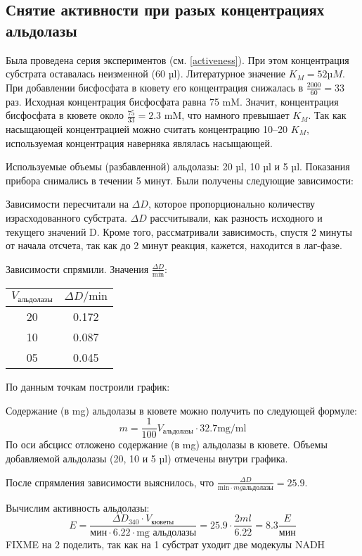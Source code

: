 \subsection{Снятие активности при разых концентрациях альдолазы}
Была проведена серия экспериментов (см. \ref{activeness}).
При этом концентрация субстрата оставалась неизменной (60 µl).
Литературное значение $K_M = 52 µM$.
При добавлении бисфосфата в кювету его концентрация снижалась в $\frac{2000}{60} = 33$ раз.
Исходная концентрация бисфосфата равна 75 mM.
Значит, концентрация бисфосфата в кювете около $\frac{75}{33} = 2.3$ mM,
что намного превышает $K_M$.
Так как насыщающей концентрацией можно считать концентрацию 10--20 $K_M$,
используемая концентрация наверняка являлась насыщающей.

Используемые объемы (разбавленной) альдолазы: 20 µl, 10 µl и 5 µl.
Показания прибора снимались в течении 5 минут.
Были получены следующие зависимости:



Зависимости пересчитали на $\Delta D$, которое пропорционально количеству израсходованного субстрата.
$\Delta D$ рассчитывали, как разность исходного и текущего значений D.
Кроме того, рассматривали зависимость, спустя 2 минуты от начала отсчета,
так как до 2 минут реакция, кажется, находится в лаг-фазе.



Зависимости спрямили. Значения $\frac{\Delta D}{\text{min}}$:

\begin{tabular}{|c|c|}
\hline
$ V_{\text{альдолазы}} $ & $ \Delta D / \text{min} $ \\
\hline
20 & 0.172 \\
10 & 0.087 \\
05 & 0.045 \\
\hline
\end{tabular}

По данным точкам построили график:



Содержание (в mg) альдолазы в кювете можно получить по следующей формуле:
$$ m = \frac{1}{100} V_\text{альдолазы} \cdot 32.7 \text{mg/ml} $$
По оси абсцисс отложено содержание (в mg) альдолазы в кювете.
Объемы добавляемой альдолазы (20, 10 и 5 µl) отмечены внутри графика.

После спрямления зависимости выяснилось, что
$\frac{\Delta D}{\text{min} \cdot {mg альдолазы}} = 25.9$.

Вычислим активность альдолазы:
$$ E = \frac{\Delta D_{340} \cdot V_{кюветы}}{\text{мин} \cdot 6.22 \cdot \text{mg альдолазы}} =
    25.9 \cdot \frac{2 ml}{6.22} = 8.3 \frac{E}{\text{мин}}$$
FIXME на 2 поделить, так как на 1 субстрат уходит две модекулы NADH


